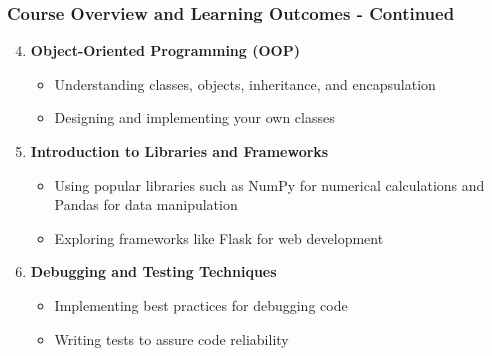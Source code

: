 \documentclass{beamer}
\begin{document}
\begin{frame}[fragile]
    \frametitle{Course Overview and Learning Outcomes - Continued}
    \begin{enumerate}
        \setcounter{enumi}{3}
        \item \textbf{Object-Oriented Programming (OOP)}
        \begin{itemize}
            \item Understanding classes, objects, inheritance, and encapsulation
            \item Designing and implementing your own classes
        \end{itemize}

        \item \textbf{Introduction to Libraries and Frameworks}
        \begin{itemize}
            \item Using popular libraries such as NumPy for numerical calculations and Pandas for data manipulation
            \item Exploring frameworks like Flask for web development
        \end{itemize}

        \item \textbf{Debugging and Testing Techniques}
        \begin{itemize}
            \item Implementing best practices for debugging code
            \item Writing tests to assure code reliability
        \end{itemize}
    \end{enumerate}
\end{frame}
\end{document}
